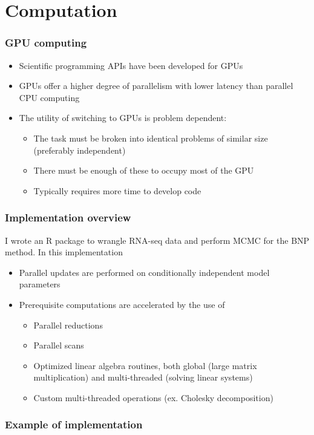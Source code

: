 \documentclass{beamer}
\begin{document}
\section{Computation}

\begin{frame}
\frametitle{GPU computing}
\begin{itemize}
\item Scientific programming APIs have been developed for GPUs
\item GPUs offer a higher degree of parallelism with lower latency than parallel CPU computing
\item The utility of switching to GPUs is problem dependent:
\begin{itemize}
  \item The task must be broken into identical problems of similar size (preferably independent)
  \item There must be enough of these to occupy most of the GPU
  \item Typically requires more time to develop code
\end{itemize}
\end{itemize}
\end{frame}

\begin{frame}
\frametitle{Implementation overview}
I wrote an R package to wrangle RNA-seq data and perform MCMC for the BNP method. In this implementation 
\begin{itemize}
\item Parallel updates are performed on conditionally independent model parameters
\item Prerequisite computations are accelerated by the use of
\begin{itemize}
  \item Parallel reductions
  \item Parallel scans
  \item Optimized linear algebra routines, both global (large matrix multiplication) and multi-threaded (solving linear systems)
  \item Custom multi-threaded operations (ex. Cholesky decomposition)
\end{itemize}
\end{itemize}
\end{frame}

\begin{frame}
\frametitle{Example of implementation}
\end{frame}
\end{document}
